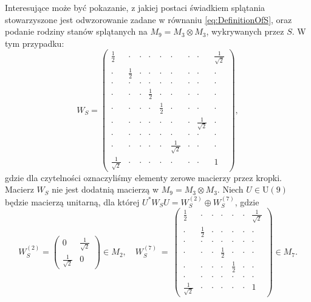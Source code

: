 Interesujące może być pokazanie, z jakiej postaci świadkiem splątania
stowarzyszone jest odwzorowanie zadane w równaniu \eqref{eq:DefinitionOfS},
oraz podanie rodziny stanów splątanych na
$M_{9} = M_{3} \! \otimes \! M_{3}$, wykrywanych przez $S$.
W tym przypadku:
\begin{equation}
\label{WS-C}
 W_S =  \left( \begin{array}{ccc|ccc|ccc}
 \frac{1}{2} &  \cdot& \cdot& \cdot& \cdot& \cdot& \cdot& \cdot& \frac{1}{\sqrt{2}} \\
 \cdot& \frac{1}{2} &\cdot& \cdot& \cdot& \cdot& \cdot& \cdot& \cdot\\
 \cdot& \cdot& \cdot & \cdot& \cdot& \cdot& \cdot& \cdot& \cdot  \\ \hline
 \cdot& \cdot& \cdot& \frac{1}{2} & \cdot& \cdot& \cdot& \cdot&  \cdot \\
 \cdot& \cdot& \cdot& \cdot& \frac{1}{2} & \cdot& \cdot& \cdot&  \cdot \\
 \cdot& \cdot& \cdot& \cdot& \cdot& \cdot& \cdot & \frac{1}{\sqrt{2}}& \cdot  \\ \hline
 \cdot& \cdot& \cdot & \cdot& \cdot& \cdot& \cdot& \cdot& \cdot  \\
 \cdot & \cdot& \cdot& \cdot& \cdot& \frac{1}{\sqrt{2}}& \cdot& \cdot& \cdot \\
 \frac{1}{\sqrt{2}}& \cdot& \cdot& \cdot& \cdot & \cdot& \cdot& \cdot& 1
  \end{array} \right),
\end{equation}
gdzie dla czytelności oznaczyliśmy elementy zerowe macierzy przez kropki.
Macierz $W_{S}$ nie jest dodatnią macierzą w
$M_{9} = M_{3} \! \otimes \! M_{3}$.
Niech $U \in \text{U}(9)$ będzie macierzą unitarną, dla której
$U^{*} W_{S} U = W_{S}^{(2)} \oplus W_{S}^{(7)}$,
gdzie
\begin{equation}
\label{WS-DirectSum}
 W_{S}^{(2)} = \left(\begin{array}{cc}
    0 & \frac{1}{\sqrt{2}}  \\ \frac{1}{\sqrt{2}}  & 0
  \end{array}\right) \in M_{2}, \quad
 W_S^{(7)}\ = \  \left( \begin{array}{ccccccc}
 \frac{1}{2} &  \cdot& \cdot& \cdot& \cdot& \cdot& \frac{1}{\sqrt{2}} \\
 \cdot& \frac{1}{2} &\cdot& \cdot& \cdot& \cdot& \cdot\\
 \cdot& \cdot& \cdot & \cdot& \cdot& \cdot& \cdot \\
 \cdot& \cdot& \cdot& \frac{1}{2} & \cdot&  \cdot& \cdot \\
 \cdot& \cdot& \cdot& \cdot& \frac{1}{2} & \cdot& \cdot \\
 \cdot& \cdot& \cdot & \cdot& \cdot& \cdot& \cdot  \\
 \frac{1}{\sqrt{2}}& \cdot& \cdot& \cdot& \cdot& \cdot& 1
  \end{array} \right) \in M_{7}.
\end{equation}

